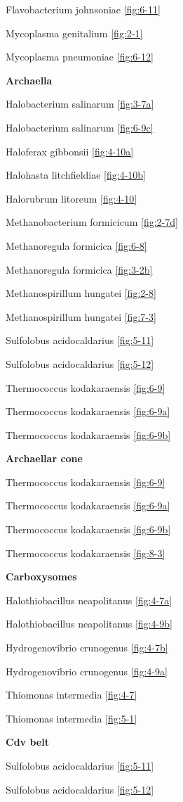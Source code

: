 \documentclass[]{tufte-book}
\begin{document}
Flavobacterium johnsoniae \ref{fig:6-11}

Mycoplasma genitalium \ref{fig:2-1}

Mycoplasma pneumoniae \ref{fig:6-12}

\textbf{Archaella}

Halobacterium salinarum \ref{fig:3-7a}

Halobacterium salinarum \ref{fig:6-9c}

Haloferax gibbonsii \ref{fig:4-10a}

Halohasta litchfieldiae \ref{fig:4-10b}

Halorubrum litoreum \ref{fig:4-10}

Methanobacterium formicicum \ref{fig:2-7d}

Methanoregula formicica \ref{fig:6-8}

Methanoregula formicica \ref{fig:3-2b}

Methanospirillum hungatei \ref{fig:2-8}

Methanospirillum hungatei \ref{fig:7-3}

Sulfolobus acidocaldarius \ref{fig:5-11}

Sulfolobus acidocaldarius \ref{fig:5-12}

Thermococcus kodakaraensis \ref{fig:6-9}

Thermococcus kodakaraensis \ref{fig:6-9a}

Thermococcus kodakaraensis \ref{fig:6-9b}

\textbf{Archaellar cone}

Thermococcus kodakaraensis \ref{fig:6-9}

Thermococcus kodakaraensis \ref{fig:6-9a}

Thermococcus kodakaraensis \ref{fig:6-9b}

Thermococcus kodakaraensis \ref{fig:8-3}

\textbf{Carboxysomes}

Halothiobacillus neapolitanus \ref{fig:4-7a}

Halothiobacillus neapolitanus \ref{fig:4-9b}

Hydrogenovibrio crunogenus \ref{fig:4-7b}

Hydrogenovibrio crunogenus \ref{fig:4-9a}

Thiomonas intermedia \ref{fig:4-7}

Thiomonas intermedia \ref{fig:5-1}

\textbf{Cdv belt}

Sulfolobus acidocaldarius \ref{fig:5-11}

Sulfolobus acidocaldarius \ref{fig:5-12}
\end{document}
